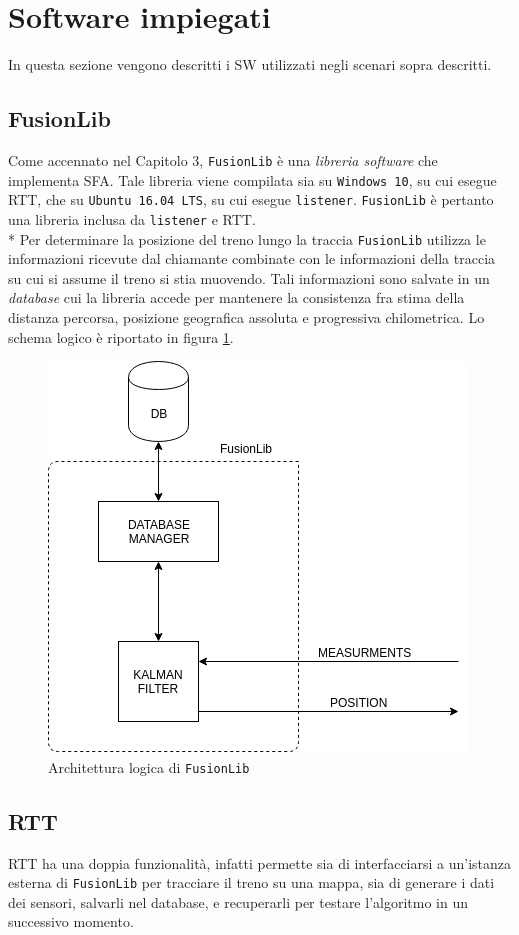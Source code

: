 \section{Software impiegati}
In questa sezione vengono descritti i SW utilizzati negli scenari sopra descritti.
\subsection{FusionLib}
Come accennato nel Capitolo 3, \texttt{FusionLib} \`e una \emph{libreria software} che implementa SFA. Tale libreria viene compilata sia su \texttt{Windows 10}, su cui esegue RTT, che su \texttt{Ubuntu 16.04 LTS}, su cui esegue \texttt{listener}. \texttt{FusionLib} \`e pertanto una libreria inclusa da \texttt{listener} e RTT.\\*
Per determinare la posizione del treno lungo la traccia \texttt{FusionLib} utilizza le informazioni ricevute dal chiamante combinate con le informazioni della traccia su cui si assume il treno si stia muovendo. Tali informazioni sono salvate in un \emph{database} cui la libreria accede per mantenere la consistenza fra stima della distanza percorsa, posizione geografica assoluta e progressiva chilometrica. Lo schema logico \`e riportato in figura \ref{fig:fulib}.
\begin{figure}[h]
	\centering
	\includegraphics[width=\linewidth]{img/fulib}
	\caption{Architettura logica di \texttt{FusionLib}}
	\label{fig:fulib}
\end{figure}
\subsection{RTT}
RTT ha una doppia funzionalit\`a, infatti permette sia di interfacciarsi a un'istanza esterna di \texttt{FusionLib} per tracciare il treno su una mappa, sia di generare i dati dei sensori, salvarli nel database, e recuperarli per testare l'algoritmo in un successivo momento.
